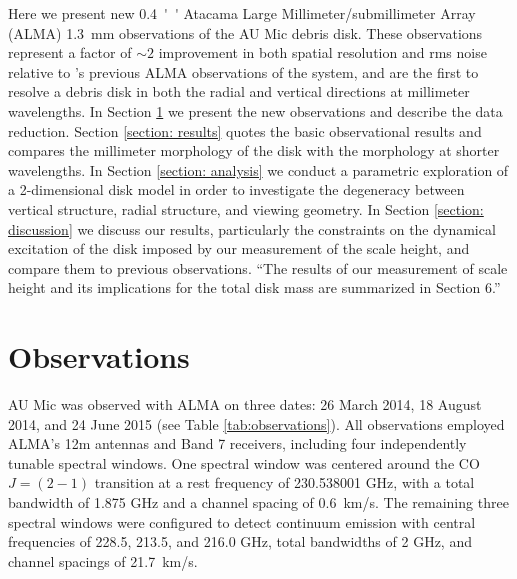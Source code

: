 \documentclass[12pt,oneside]{article}
\begin{document}
Here we present new \SI{0.4}{''} Atacama Large Millimeter/submillimeter Array \newline (ALMA) \SI{1.3}{mm} observations of the AU Mic debris disk. 
These observations represent a factor of $\sim 2$ improvement in both spatial resolution and rms noise relative to \cite{macgregor13}'s previous ALMA observations of the system, and are the first to resolve a debris disk in both the radial and vertical directions at millimeter wavelengths. 
In Section \ref{section: observations} we present the new observations and describe the data reduction.  
Section \ref{section: results} quotes the basic observational results and compares the millimeter morphology of the disk with the morphology at shorter wavelengths.  
In Section \ref{section: analysis} we conduct a parametric exploration of a 2-dimensional disk model in order to investigate the degeneracy between vertical structure, radial structure, and viewing geometry.
In Section \ref{section: discussion} we discuss our results, particularly the constraints on the dynamical excitation of the disk imposed by our measurement of the scale height, and compare them to previous observations.
“The results of our measurement of scale height and its implications for the total disk mass are summarized in Section 6.” 



\section{Observations}
\label{section: observations}
AU Mic was observed  with ALMA on three dates: 26 March 2014, 18 August 2014, and 24 June 2015 (see Table \ref{tab:observations}). 
All observations employed ALMA's 12m antennas and Band 7 receivers, including four independently tunable spectral windows. 
One spectral window was centered around the CO $J = (2-1)$ transition at a rest frequency of 230.538001 GHz, with a total bandwidth of 1.875 GHz and a channel spacing of \SI{0.6}{km/s}.
The remaining three spectral windows were configured to detect continuum emission with central frequencies of 228.5, 213.5, and 216.0 GHz, total bandwidths of 2 GHz, and channel spacings of \SI{21.7}{km/s}.

\end{document}
